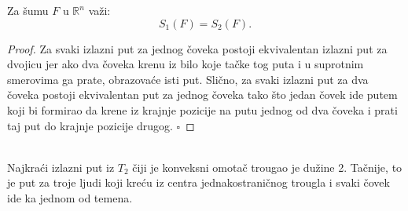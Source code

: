 \documentclass[11pt,letter]{article}
\begin{document}
\lem Za \v sumu $F$ u $\mathbb{R}^n$ va\v zi: $$S_1(F)=S_2(F).$$
\begin{proof}
Za svaki izlazni put za jednog \v coveka postoji ekvivalentan izlazni put za dvojicu jer ako dva \v coveka krenu iz bilo koje ta\v cke tog puta i u suprotnim smerovima ga prate, obrazova\' ce isti put. Sli\v cno, za svaki izlazni put za dva \v coveka postoji ekvivalentan put za jednog \v coveka tako \v sto jedan \v covek ide putem koji bi formirao da krene iz krajnje pozicije na putu jednog od dva \v coveka i prati taj put do krajnje pozicije drugog.
$\square$
\end{proof}
\\
\teo Najkra\' ci izlazni put iz $T_2$ \v ciji je konveksni omota\v c trougao je du\v zine 2. Ta\v cnije, to je put za troje ljudi koji kre\' cu iz centra jednakostrani\v cnog trougla i svaki \v covek ide ka jednom od temena.
\\
\\ 
\end{document}
